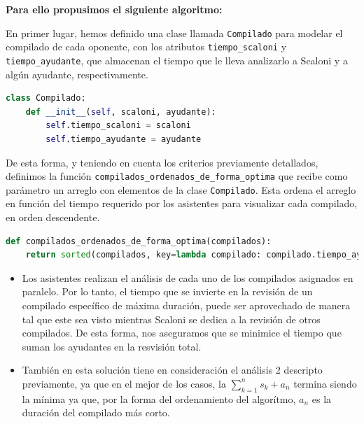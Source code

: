 \textbf{Para ello propusimos el siguiente algoritmo:}

En primer lugar, hemos definido una clase llamada \texttt{Compilado} para modelar el compilado de cada 
oponente, con los atributos \texttt{tiempo\_scaloni} y \texttt{tiempo\_ayudante}, que almacenan 
el tiempo que le lleva analizarlo a Scaloni y a algún ayudante, respectivamente.

\begin{lstlisting}[language=Python]
class Compilado:
    def __init__(self, scaloni, ayudante):
        self.tiempo_scaloni = scaloni
        self.tiempo_ayudante = ayudante
\end{lstlisting}

De esta forma, y teniendo en cuenta los criterios previamente detallados, definimos la función
\texttt{compilados\_ordenados\_de\_forma\_optima} que recibe como parámetro un arreglo con
elementos de la clase \texttt{Compilado}. Esta ordena el arreglo en función del tiempo requerido
por los asistentes para visualizar cada compilado, en orden descendente. 

\begin{lstlisting}[language=Python]
def compilados_ordenados_de_forma_optima(compilados):
    return sorted(compilados, key=lambda compilado: compilado.tiempo_ayudante, reverse=True)
\end{lstlisting}



\begin{itemize}
    \item Los asistentes realizan el análisis de cada uno de los compilados asignados en paralelo. Por lo 
tanto, el tiempo que se invierte en la revisión de un compilado específico de máxima duración, 
puede ser aprovechado de manera tal que este sea visto mientras Scaloni se dedica a la revisión
de otros compilados. De esta forma, nos aseguramos que se minimice el tiempo que suman los ayudantes 
en la resvisión total. 
    \item También en esta solución tiene en consideración el análisis 2 descripto previamente, ya que en el mejor de los casos,
    la $\sum_{k=1}^{n} s_k + a_n$ termina siendo la mínima ya que, por la forma del ordenamiento del algorítmo, $a_n$ es la duración del compilado más corto.

\end{itemize}